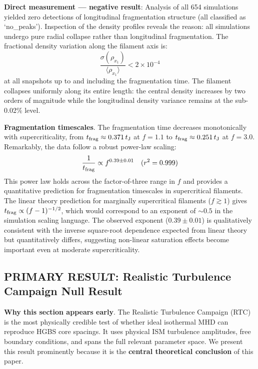 \documentclass[twocolumn,usenatbib]{mnras}
\begin{document}
\textbf{Direct measurement --- negative result}: Analysis of all 654 simulations yielded zero detections of longitudinal fragmentation structure (all classified as `no\_peaks'). Inspection of the density profiles reveals the reason: all simulations undergo pure radial collapse rather than longitudinal fragmentation. The fractional density variation along the filament axis is:
\begin{equation}
\frac{\sigma(\rho_{x_1})}{\langle \rho_{x_1} \rangle} < 2 \times 10^{-4}
\end{equation}
at all snapshots up to and including the fragmentation time. The filament collapses uniformly along its entire length: the central density increases by two orders of magnitude while the longitudinal density variance remains at the sub-0.02\% level.

\textbf{Fragmentation timescales}. The fragmentation time decreases monotonically with supercriticality, from $t_{\rm frag} \approx 0.371\,t_{\rm J}$ at $f = 1.1$ to $t_{\rm frag} \approx 0.251\,t_{\rm J}$ at $f = 3.0$. Remarkably, the data follow a robust power-law scaling:
\begin{equation}
\frac{1}{t_{\rm frag}} \propto f^{0.39 \pm 0.01} \quad (r^2 = 0.999)
\end{equation}
This power law holds across the factor-of-three range in $f$ and provides a quantitative prediction for fragmentation timescales in supercritical filaments. The linear theory prediction for marginally supercritical filaments ($f \gtrsim 1$) gives $t_{\rm frag} \propto (f - 1)^{-1/2}$, which would correspond to an exponent of $\sim 0.5$ in the simulation scaling language. The observed exponent ($0.39 \pm 0.01$) is qualitatively consistent with the inverse square-root dependence expected from linear theory but quantitatively differs, suggesting non-linear saturation effects become important even at moderate supercriticality.

\subsection{PRIMARY RESULT: Realistic Turbulence Campaign Null Result}
\label{sec:rtc}

\textbf{Why this section appears early}. The Realistic Turbulence Campaign (RTC) is the most physically credible test of whether ideal isothermal MHD can reproduce HGBS core spacings. It uses physical ISM turbulence amplitudes, free boundary conditions, and spans the full relevant parameter space. We present this result prominently because it is the \textbf{central theoretical conclusion} of this paper.
\end{document}
